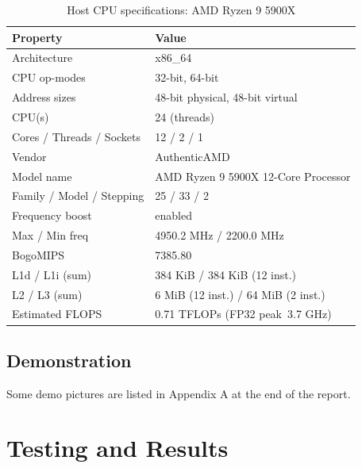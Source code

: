 \documentclass[12pt,a4paper]{report}
\begin{document}
    \begin{table}[H]
    \centering
    \caption{Host CPU specifications: AMD Ryzen 9 5900X}
    \label{tab:cpu_specs}
    \begin{tabular}{@{}ll@{}}
    \toprule
    Property & Value \\
    \midrule
    Architecture                               & x86\_64 \\
    CPU op-modes                               & 32-bit, 64-bit \\
    Address sizes                              & 48-bit physical, 48-bit virtual \\
    CPU(s)                                     & 24 (threads) \\
    Cores / Threads / Sockets                  & 12 / 2 / 1 \\
    Vendor                                     & AuthenticAMD \\
    Model name                                 & AMD Ryzen 9 5900X 12-Core Processor \\
    Family / Model / Stepping                  & 25 / 33 / 2 \\
    Frequency boost                            & enabled \\
    Max / Min freq                             & 4950.2 MHz / 2200.0 MHz \\
    BogoMIPS                                   & 7385.80 \\
    L1d / L1i (sum)                            & 384 KiB / 384 KiB (12 inst.) \\
    L2 / L3 (sum)                              & 6 MiB (12 inst.) / 64 MiB (2 inst.) \\
    Estimated FLOPS                            & 0.71 TFLOPs (FP32 peak\, 3.7 GHz) \\
    \bottomrule
    \end{tabular}
    \end{table}

    \section{Demonstration}

    Some demo pictures are listed in Appendix A at the end of the report.


\chapter{Testing and Results}
\noindent
\end{document}
